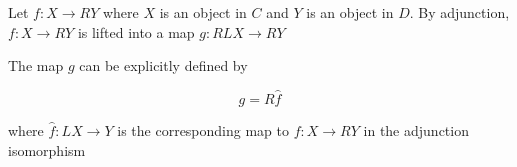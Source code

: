 \documentclass{article}
\begin{document}
\begin{longproof}
\end{longproof}


\begin{example}
    Let $f: X \to RY$ where $X$ is an object in $C$ and $Y$ is an object in $D$. By adjunction, $f: X \to RY$ is lifted into a map $g: RLX \to RY$

    \begin{center}
    \end{center}

    The map $g$ can be explicitly defined by

    $$
        g = R \hat{f}
    $$

    where $\hat{f}: LX \to Y$ is the corresponding map to $f: X \to RY$ in the adjunction isomorphism
\end{example}
\end{document}

